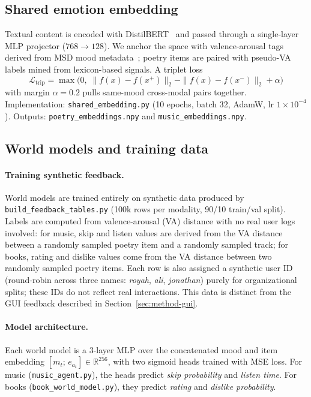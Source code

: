 \documentclass[11pt]{article}
\begin{document}
\subsection{Shared emotion embedding}
\label{sec:method-embedding}

Textual content is encoded with DistilBERT~\cite{sanh2020distilbert} and
passed through a single-layer MLP projector ($768 \rightarrow 128$). We
anchor the space with valence-arousal tags derived from MSD mood
metadata~\cite{bertinmahieux2011msd}; poetry items are paired with
pseudo-VA labels mined from lexicon-based signals. A triplet loss
\[
\mathcal{L}_\text{trip} =
    \max\!\bigl(0,\;
        \|f(x)-f(x^+)\|_2 - \|f(x)-f(x^-)\|_2 + \alpha
    \bigr)
\]
with margin $\alpha{=}0.2$ pulls same-mood cross-modal pairs together.
Implementation: \texttt{shared\_embedding.py} (10 epochs, batch 32,
AdamW, lr $1{\times}10^{-4}$). Outputs: \texttt{poetry\_embeddings.npy}
and \texttt{music\_embeddings.npy}.

\subsection{World models and training data}
\label{sec:method-wm}

\paragraph{Training synthetic feedback.}
World models are trained entirely on synthetic data produced by
\texttt{build\_feedback\_tables.py} (100k rows per modality, 90/10
train/val split). Labels are computed from valence-arousal (VA) distance
with no real user logs involved: for music, skip and listen values are
derived from the VA distance between a randomly sampled poetry item and a
randomly sampled track; for books, rating and dislike values come from
the VA distance between two randomly sampled poetry items. Each row is
also assigned a synthetic user ID (round-robin across three names:
\emph{royah}, \emph{ali}, \emph{jonathan}) purely for organizational
splits; these IDs do not reflect real interactions. This data is
distinct from the GUI feedback described in
Section~\ref{sec:method-gui}.

\paragraph{Model architecture.}
Each world model is a 3-layer MLP over the concatenated mood and item
embedding $[m_t;\, e_{a_t}] \in \mathbb{R}^{256}$, with two sigmoid
heads trained with MSE loss. For music (\texttt{music\_agent.py}), the
heads predict \emph{skip probability} and \emph{listen time}. For books
(\texttt{book\_world\_model.py}), they predict \emph{rating} and
\emph{dislike probability}.
\end{document}
